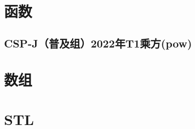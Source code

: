 \documentclass[12pt,twiside,a4paper]{ctexbook}
\numberwithin{chapter}{part}
\begin{document}
\chapter{函数}
\section{CSP-J（普及组）2022年T1乘方(pow)}

\chapter{数组}

\chapter{STL}

\clearpage
\end{document}
